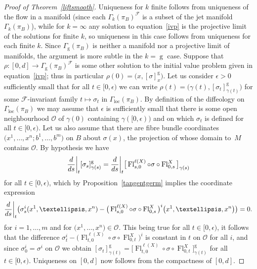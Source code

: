 \documentclass[11pt]{article}
\numberwithin{equation}{section}
\numberwithin{equation}{section}
\def\loc{\operatorname{loc}}
\def\g{\operatorname{g}}
\def\Fl{\operatorname{Fl}}
\def\FF{{\mathcal{F}}}
\def\OO{{\mathcal{O}}}
\begin{document}
\begin{proof}[Proof of Theorem~\ref{liftsmooth}]
Uniqueness for $k$ finite follows from uniqueness of the flow in a manifold (since each $\Gamma_{k}(\pi_{B})^{\FF}$ is a subset of the jet manifold $\Gamma_{k}(\pi_{B})$), while for $k=\infty$ any solution to equation~\eqref{ivp} is the projective limit of the solutions for finite $k$, so uniqueness in this case follows from uniqueness for each finite $k$. Since $\Gamma_{\g}(\pi_{B})$ is neither a manifold nor a projective limit of manifolds, the argument is more subtle in the $k=\g$ case. Suppose that $\rho\colon [0,d]\rightarrow\Gamma_{\g}(\pi_{B})^{\FF}$ is some other solution to the initial value problem given in equation~\eqref{ivp}; thus in particular $\rho(0) = \big(x,[\sigma]^{\g}_{x}\big)$. Let us consider $\epsilon>0$ sufficiently small that for all $t\in[0,\epsilon)$ we can write $\rho(t) = \big(\gamma(t),[\sigma_{t}]^{\g}_{\gamma(t)}\big)$ for some $\FF$-invariant family $t\mapsto\sigma_{t}$ in $\Gamma_{\loc}(\pi_{B})$. By definition of the diffeology on $\Gamma_{\loc}(\pi_{B})$ we may assume that $\epsilon$ is sufficiently small that there is some open neighbourhood $\OO$ of $\gamma(0)$ containing $\gamma([0,\epsilon))$ and on which $\sigma_{t}$ is defined for all $t\in[0,\epsilon)$. Let us also assume that there are fibre bundle coordinates $\big(x^{1},\dots,x^{n};b^{1},\dots,b^{m}\big)$ on $B$ about $\sigma(x)$, the projection of whose domain to~$M$ contains $\OO$. By hypothesis we have\vspace{-1ex}
\begin{gather*}
\frac{\rm d}{{\rm d}s}\bigg|_{t}[\sigma_{s}]^{\g}_{\gamma(s)} = \frac{\rm d}{{\rm d}s}\bigg|_{t}\big[\Fl^{\ell(X)}_{s,0}\circ\sigma\circ\Fl^{X}_{0,s}\big]_{\gamma(s)}
\end{gather*}
for all $t\in[0,\epsilon)$, which by Proposition~\ref{tangentgerm} implies the coordinate expression\vspace{-1ex}
\begin{gather*}
\frac{\rm d}{{\rm d}s}\bigg|_{t}\big(\sigma^{i}_{s}(x^{1},\dots,x^{n})- \big(\Fl^{\ell(X)}_{s,0}\circ\sigma\circ\Fl^{X}_{0,s}\big)^{i}\big(x^{1},\dots,x^{n}\big)\big) = 0.
\end{gather*}
for $i=1,\dots,m$ and for $\big(x^{1},\dots,x^{n}\big)\in\OO$. This being true for all $t\in[0,\epsilon)$, it follows that the difference $\sigma^{i}_{t}-\big(\Fl^{\ell(X)}_{t,0}\circ\sigma\circ\Fl^{X}_{0,t}\big)^{i}$ is constant in $t$ on $\OO$ for all $i$, and since $\sigma^{i}_{0} = \sigma^{i}$ on $\OO$ we obtain $[\sigma_{t}]^{\g}_{\gamma(t)} = \big[\Fl^{\ell(X)}_{t,0}\circ\sigma\circ\Fl^{X}_{0,t}\big]^{\g}_{\gamma(t)}$ for all $t\in[0,\epsilon)$. Uniqueness on $[0,d]$ now follows from the compactness of $[0,d]$.



\end{proof}
\end{document}
